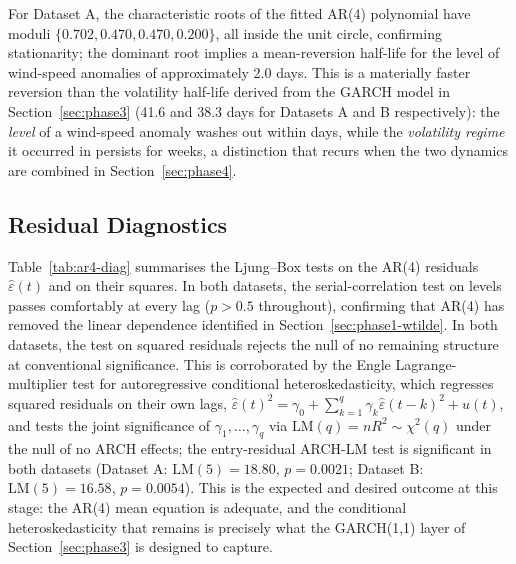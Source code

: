 For Dataset A, the characteristic roots of the fitted AR(4) polynomial have moduli $\{0.702, 0.470, 0.470, 0.200\}$, all inside the unit circle, confirming stationarity; the dominant root implies a mean-reversion half-life for the level of wind-speed anomalies of approximately 2.0 days. This is a materially faster reversion than the volatility half-life derived from the GARCH model in Section~\ref{sec:phase3} (41.6 and 38.3 days for Datasets A and B respectively): the \emph{level} of a wind-speed anomaly washes out within days, while the \emph{volatility regime} it occurred in persists for weeks, a distinction that recurs when the two dynamics are combined in Section~\ref{sec:phase4}.

\subsection{Residual Diagnostics}
\label{sec:phase2-diag}

Table~\ref{tab:ar4-diag} summarises the Ljung--Box tests on the AR(4) residuals $\hat\varepsilon(t)$ and on their squares. In both datasets, the serial-correlation test on levels passes comfortably at every lag ($p > 0.5$ throughout), confirming that AR(4) has removed the linear dependence identified in Section~\ref{sec:phase1-wtilde}. In both datasets, the test on squared residuals rejects the null of no remaining structure at conventional significance. This is corroborated by the Engle \citeyearpar{Engle1982} Lagrange-multiplier test for autoregressive conditional heteroskedasticity, which regresses squared residuals on their own lags, $\hat\varepsilon(t)^2 = \gamma_0 + \sum_{k=1}^q \gamma_k \hat\varepsilon(t-k)^2 + u(t)$, and tests the joint significance of $\gamma_1,\dots,\gamma_q$ via $\text{LM}(q) = nR^2 \sim \chi^2(q)$ under the null of no ARCH effects; the entry-residual ARCH-LM test is significant in both datasets (Dataset A: $\text{LM}(5) = 18.80$, $p = 0.0021$; Dataset B: $\text{LM}(5) = 16.58$, $p = 0.0054$). This is the expected and desired outcome at this stage: the AR(4) mean equation is adequate, and the conditional heteroskedasticity that remains is precisely what the GARCH(1,1) layer of Section~\ref{sec:phase3} is designed to capture.

